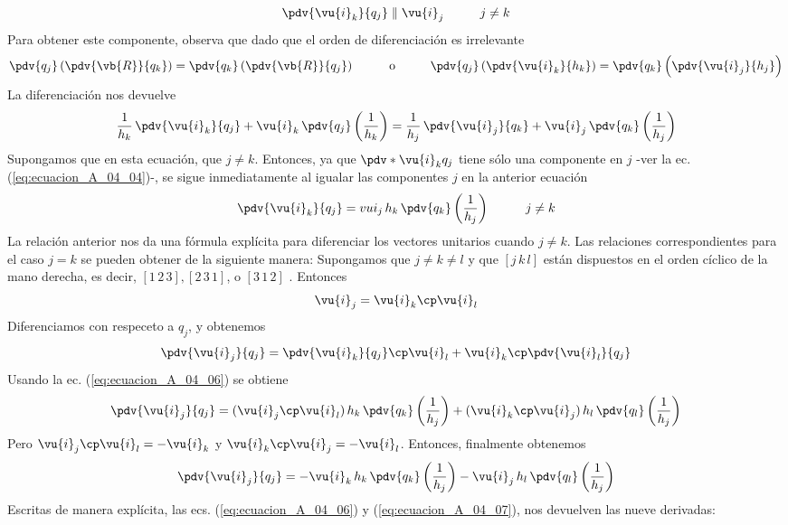 \begin{align}
\pdv{\vu{i}_{k}}{q_{j}} \parallel \vu{i}_{j} \hspace{1cm} j \neq k 
\label{eq:ecuacion_A_04_04}    
\end{align}
Para obtener este componente, observa que dado que el orden de diferenciación es irrelevante
\begin{align*}
\pdv{q_{j}} \left( \pdv{\vb{R}}{q_{k}} \right) = \pdv{q_{k}} \left( \pdv{\vb{R}}{q_{j}} \right) \hspace{1cm} \mbox{o} \hspace{1cm} \pdv{q_{j}} \left( \pdv{\vu{i}_{k}}{h_{k}} \right) = \pdv{q_{k}} \left( \pdv{\vu{i}_{j}}{h_{j}} \right)
\end{align*}
La diferenciación nos devuelve
\begin{align}
\dfrac{1}{h_{k}} \, \pdv{\vu{i}_{k}}{q_{j}} + \vu{i}_{k} \, \pdv{q_{j}} \left( \dfrac{1}{h_{k}} \right) = \dfrac{1}{h_{j}} \, \pdv{\vu{i}_{j}}{q_{k}} + \vu{i}_{j} \, \pdv{q_{k}} \left( \dfrac{1}{h_{j}} \right)
\label{eq:ecuacion_A_04_05}    
\end{align}
Supongamos que en esta ecuación, que $j \neq k$. Entonces, ya que $\pdv*{\vu{i}_{k}}{q_{j}}$ tiene sólo una componente en $j$ -ver la ec. (\ref{eq:ecuacion_A_04_04})-, se sigue inmediatamente al igualar las componentes $j$ en la anterior ecuación
\begin{align}
\pdv{\vu{i}_{k}}{q_{j}} = vu{i}_{j} \, h_{k} \, \pdv{q_{k}} \left( \dfrac{1}{h_{j}} \right) \hspace{1cm} j \neq k
\label{eq:ecuacion_A_04_06}    
\end{align}
La relación anterior nos da una fórmula explícita para diferenciar los vectores unitarios cuando $j \neq k$. Las relaciones correspondientes para el caso $j = k$ se pueden obtener de la siguiente manera: Supongamos que $j \neq k \neq l$ y que $[j \, k \, l]$ están dispuestos en el orden cíclico de la mano derecha, es decir, $[1 \, 2 \, 3], [2 \, 3 \,1]$, o $[3 \, 1 \, 2]$ . Entonces
\begin{align*}
\vu{i}_{j} = \vu{i}_{k} \cp \vu{i}_{l}
\end{align*}
Diferenciamos con respeceto a $q_{j}$, y obtenemos
\begin{align*}
\pdv{\vu{i}_{j}}{q_{j}} = \pdv{\vu{i}_{k}}{q_{j}} \cp \vu{i}_{l} + \vu{i}_{k} \cp \pdv{\vu{i}_{l}}{q_{j}}
\end{align*}
Usando la ec. (\ref{eq:ecuacion_A_04_06}) se obtiene
\begin{align*}
\pdv{\vu{i}_{j}}{q_{j}} = (\vu{i}_{j} \cp \vu{i}_{l}) \, h_{k} \, \pdv{q_{k}} \left( \dfrac{1}{h_{j}} \right) + (\vu{i}_{k} \cp \vu{i}_{j}) \, h_{l} \, \pdv{q_{l}} \left( \dfrac{1}{h_{j}} \right)
\end{align*}
Pero $\vu{i}_{j} \cp \vu{i}_{l} = - \vu{i}_{k}$ y $\vu{i}_{k} \cp \vu{i}_{j} = - \vu{i}_{l}$. Entonces, finalmente obtenemos
\begin{align}
\pdv{\vu{i}_{j}}{q_{j}} = - \vu{i}_{k} \, h_{k} \, \pdv{q_{k}} \left( \dfrac{1}{h_{j}} \right) - \vu{i}_{j} \, h_{l} \, \pdv{q_{l}} \left( \dfrac{1}{h_{j}} \right)
\label{eq:ecuacion_A_04_07}    
\end{align}
Escritas de manera explícita, las ecs. (\ref{eq:ecuacion_A_04_06}) y (\ref{eq:ecuacion_A_04_07}), nos devuelven las nueve derivadas:
